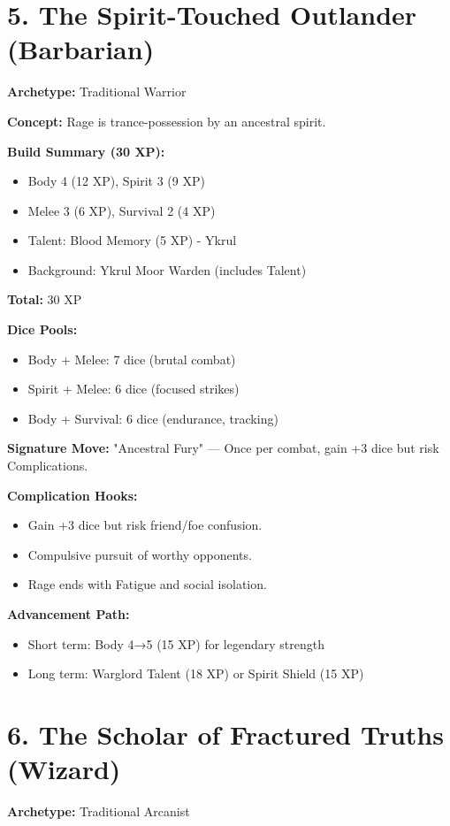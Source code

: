 \section{5. The Spirit-Touched Outlander (Barbarian)}
\textbf{Archetype:} Traditional Warrior

\textbf{Concept:} Rage is trance-possession by an ancestral spirit.

\textbf{Build Summary (30 XP):}
\begin{itemize}
  \item Body 4 (12 XP), Spirit 3 (9 XP)
  \item Melee 3 (6 XP), Survival 2 (4 XP)
  \item Talent: Blood Memory (5 XP) - Ykrul
  \item Background: Ykrul Moor Warden (includes Talent)
\end{itemize}
\textbf{Total:} 30 XP

\textbf{Dice Pools:}
\begin{itemize}
  \item Body + Melee: 7 dice (brutal combat)
  \item Spirit + Melee: 6 dice (focused strikes)
  \item Body + Survival: 6 dice (endurance, tracking)
\end{itemize}

\textbf{Signature Move:} "Ancestral Fury" — Once per combat, gain +3 dice but risk Complications.

\textbf{Complication Hooks:}
\begin{itemize}
  \item Gain +3 dice but risk friend/foe confusion.
  \item Compulsive pursuit of worthy opponents.
  \item Rage ends with Fatigue and social isolation.
\end{itemize}

\textbf{Advancement Path:}
\begin{itemize}
  \item Short term: Body 4→5 (15 XP) for legendary strength
  \item Long term: Warglord Talent (18 XP) or Spirit Shield (15 XP)
\end{itemize}

\section{6. The Scholar of Fractured Truths (Wizard)}
\textbf{Archetype:} Traditional Arcanist

